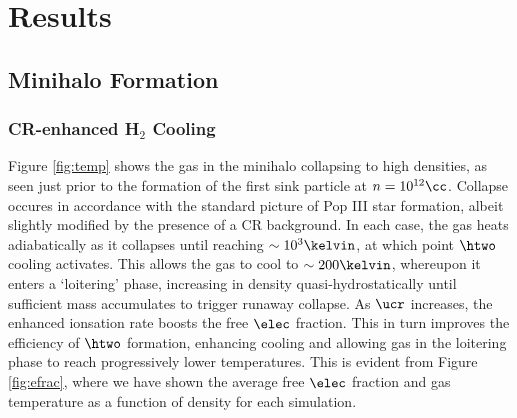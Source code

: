 \section{Results}
\label{sec:results}
\subsection{Minihalo Formation}
\subsubsection{CR-enhanced H$_2$ Cooling}
\label{sec:initial_collapse}

Figure \ref{fig:temp} shows the gas in the minihalo collapsing to high densities, as seen just prior to the formation of the first sink particle at $n=10^{12}\cc$.  Collapse occures in accordance with the standard picture of Pop III star formation, albeit slightly modified by the presence of a CR background.  In each case, the gas heats adiabatically as it collapses until reaching $\sim10^3\kelvin$, at which point $\htwo$ cooling activates.  This allows the gas to cool to $\sim200\kelvin$, whereupon it enters a `loitering' phase, increasing in density quasi-hydrostatically until sufficient mass accumulates to trigger runaway collapse.  As $\ucr$ increases, the enhanced ionsation rate boosts the free $\elec$ fraction.  This in turn improves the efficiency of $\htwo$ formation, enhancing cooling and allowing gas in the loitering phase to reach progressively lower temperatures.  This is evident from Figure \ref{fig:efrac}, where we have shown the average free $\elec$ fraction and gas temperature as a function of density for each simulation.

